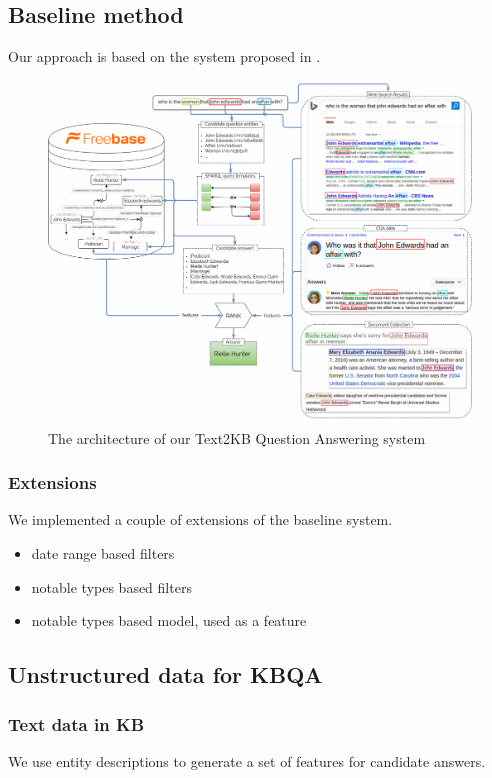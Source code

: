 
\subsection{Baseline method}
Our approach is based on the system proposed in \cite{ACCU:2015}.

\begin{figure}[t]
\centering
\includegraphics[width=\textwidth]{img/Text2KB_model}
\caption{The architecture of our Text2KB Question Answering system}
\label{fig:model}
\end{figure}

\subsubsection{Extensions}
We implemented a couple of extensions of the baseline system.

\begin{itemize}
\item date range based filters
\item notable types based filters
\item notable types based model, used as a feature
\end{itemize}

\subsection{Unstructured data for KBQA}

\subsubsection{Text data in KB}
We use entity descriptions to generate a set of features for candidate answers.

